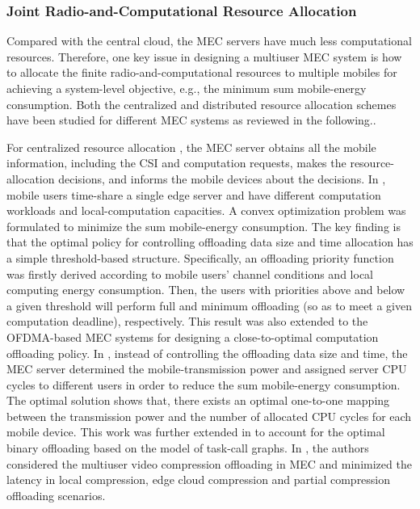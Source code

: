 \documentclass[journal]{IEEEtran}
\begin{document}
\subsubsection{\textbf{Joint Radio-and-Computational Resource Allocation}}
Compared with the central cloud, the MEC servers have much less  computational resources. Therefore, one key issue in designing  a multiuser MEC system is how to allocate the finite radio-and-computational  resources to multiple mobiles for achieving a system-level  objective, e.g., the minimum sum mobile-energy consumption. Both the centralized and distributed resource allocation schemes have been studied for different MEC systems as reviewed in the following..

For  centralized resource allocation
\cite{you2016energy,barbarossa2013joint,PLorenzo1603,hoang2012optimal,YMao1612GC,KWang16TCC,ren2017latency,MHChen1605,MHChen1704}, the MEC server obtains all the mobile information, including the CSI and computation requests, makes the resource-allocation decisions, and informs the mobile devices about the decisions. In \cite{you2016energy}, mobile users time-share a single edge server and have different computation workloads and local-computation capacities. A convex optimization problem was formulated to minimize the sum mobile-energy consumption. The key finding is that the optimal policy for controlling offloading data size and time allocation has a simple threshold-based structure. Specifically, an offloading priority function was firstly derived according to mobile users' channel conditions and local computing energy consumption. Then, the users with priorities above and below a given threshold will perform full and minimum offloading (so as to meet a given computation deadline), respectively. This result was also extended to the OFDMA-based MEC systems for designing a close-to-optimal computation offloading policy. In \cite{barbarossa2013joint}, instead of controlling the offloading data size and time, the MEC server determined the mobile-transmission  power and assigned server CPU cycles to different users in order to reduce the sum mobile-energy consumption. The optimal solution shows that, there exists an optimal  one-to-one mapping  between the transmission   power and the number of allocated CPU cycles for each mobile device. This work was further extended in \cite{PLorenzo1603} to account for the optimal binary offloading based on the model of task-call graphs. In \cite{ren2017latency}, the authors considered the multiuser video compression offloading in MEC and minimized the latency in local compression, edge cloud compression and partial compression offloading scenarios.
\end{document}

